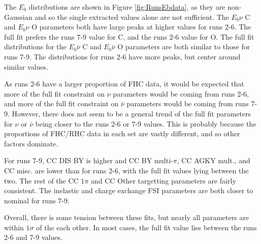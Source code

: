 The $E_b$ distributions are shown in Figure \ref{fig:RunsEbdata}, as they are non-Gaussian and so the single extracted values alone are not sufficient. The $E_b \nu$ C and $E_b \nu$ O parameters both have large peaks at higher values for runs 2-6. The full fit prefers the runs 7-9 value for C, and the runs 2-6 value for O. The full fit distributions for the $E_b \bar{\nu}$ C and $E_b \bar{\nu}$ O parameters are both similar to those for runs 7-9. The distributions for runs 2-6 have more peaks, but center around similar values.

As runs 2-6 have a larger proportion of FHC data, it would be expected that more of the full fit constraint on $\nu$ parameters would be coming from runs 2-6, and more of the full fit constraint on $\bar{\nu}$ parameters would be coming from runs 7-9. However, there does not seem to be a general trend of the full fit parameters for $\nu$ or $\bar{\nu}$ being closer to the runs 2-6 or 7-9 values. This is probably because the proportions of FHC/RHC data in each set are vastly different, and so other factors dominate.

For runs 7-9, CC DIS BY is higher and CC BY multi-$\pi$, CC AGKY mult., and CC misc. are lower than for runs 2-6, with the full fit values lying between the two. The rest of the CC $1\pi$ and CC Other targetting parameters are fairly consistent. The inelastic and charge exchange FSI parameters are both closer to nominal for runs 7-9.

Overall, there is some tension between these fits, but nearly all parameters are within $1\sigma$ of the each other. In most cases, the full fit value lies between the runs 2-6 and 7-9 values.

